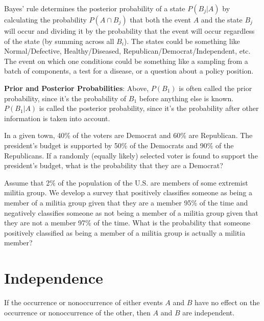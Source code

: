 \documentclass[]{book}
\theoremstyle{definition}
\theoremstyle{definition}
\theoremstyle{definition}
\theoremstyle{remark}
\let\BeginKnitrBlock\begin \let\EndKnitrBlock\end
\begin{document}
Bayes' rule determines the posterior probability of a state \(P(B_j|A)\)
by calculating the probability \(P(A \cap B_j)\) that both the event
\(A\) and the state \(B_j\) will occur and dividing it by the
probability that the event will occur regardless of the state (by
summing across all \(B_i\)). The states could be something like
Normal/Defective, Healthy/Diseased, Republican/Democrat/Independent,
etc. The event on which one conditions could be something like a
sampling from a batch of components, a test for a disease, or a question
about a policy position.

\textbf{Prior and Posterior Probabilities}: Above, \(P(B_1)\) is often
called the prior probability, since it's the probability of \(B_1\)
before anything else is known. \(P(B_1|A)\) is called the posterior
probability, since it's the probability after other information is taken
into account.

\BeginKnitrBlock{example}[Bayes' Rule]
\protect\hypertarget{exm:bayesrule}{}{\label{exm:bayesrule} {} } In a given town, 40\% of the voters are Democrat and 60\%
are Republican. The president's budget is supported by 50\% of the
Democrats and 90\% of the Republicans. If a randomly (equally likely)
selected voter is found to support the president's budget, what is the
probability that they are a Democrat?
\EndKnitrBlock{example}

\BeginKnitrBlock{exercise}[Conditional Probability]
\protect\hypertarget{exr:condprobexr}{}{\label{exr:condprobexr}
{} }

Assume that 2\% of the population of the U.S. are members of some
extremist militia group. We develop a survey that positively classifies
someone as being a member of a militia group given that they are a
member 95\% of the time and negatively classifies someone as not being a
member of a militia group given that they are not a member 97\% of the
time. What is the probability that someone positively classified as
being a member of a militia group is actually a militia member?
\EndKnitrBlock{exercise}

\section{Independence}\label{independence}

\BeginKnitrBlock{definition}[Independence]
\protect\hypertarget{def:unnamed-chunk-70}{}{\label{def:unnamed-chunk-70}
{} } If the occurrence or nonoccurrence of
either events \(A\) and \(B\) have no effect on the occurrence or
nonoccurrence of the other, then \(A\) and \(B\) are independent.
\EndKnitrBlock{definition}
\end{document}
